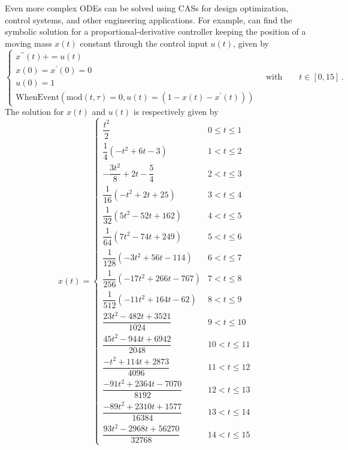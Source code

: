\begin{example}
Even more complex \acp{ODE} can be solved using \acp{CAS} for design optimization, control systems, and other engineering applications. For example, \Mathematica{} can find the symbolic solution for a proportional-derivative controller keeping the position of a moving mass $x(t)$ constant through the control input $u(t)$, given by
%
\begin{equation}
  \begin{cases}
    x^{\prime\prime}(t) + = u(t) \\[0.1em]
    x(0) = x^{\prime}(0) = 0 \\[0.1em]
    u(0) = 1 \\[0.1em]
    \mathrm{WhenEvent}(\mathrm{mod}(t, \tau) = 0, u(t) = (1 - x(t) - x^{\prime}(t)))
  \end{cases}
  \quad \text{with} \qquad t \in [0, 15] \, \text{.}
\end{equation}
%
The solution for $x(t)$ and $u(t)$ is respectively given by
%
\begin{equation}
  x(t) = \begin{cases}
    \dfrac{t^2}{2} & 0\leq t\leq 1 \\[0.1em]
    \dfrac{1}{4} \left(-t^2+6 t-3\right) & 1<t\leq 2 \\[0.1em]
    -\dfrac{3 t^2}{8}+2 t-\dfrac{5}{4} & 2<t\leq 3 \\[0.1em]
    \dfrac{1}{16} \left(-t^2+2 t+25\right) & 3<t\leq 4 \\[0.1em]
    \dfrac{1}{32} \left(5 t^2-52 t+162\right) & 4<t\leq 5 \\[0.1em]
    \dfrac{1}{64} \left(7 t^2-74 t+249\right) & 5<t\leq 6 \\[0.1em]
    \dfrac{1}{128} \left(-3 t^2+56 t-114\right) & 6<t\leq 7 \\[0.1em]
    \dfrac{1}{256} \left(-17 t^2+266 t-767\right) & 7<t\leq 8 \\[0.1em]
    \dfrac{1}{512} \left(-11 t^2+164 t-62\right) & 8<t\leq 9 \\[0.1em]
    \dfrac{23 t^2-482 t+3521}{1024} & 9<t\leq 10 \\[0.1em]
    \dfrac{45 t^2-944 t+6942}{2048} & 10<t\leq 11 \\[0.1em]
    \dfrac{-t^2+114 t+2873}{4096} & 11<t\leq 12 \\[0.1em]
    \dfrac{-91 t^2+2364 t-7070}{8192} & 12<t\leq 13 \\[0.1em]
    \dfrac{-89 t^2+2310 t+1577}{16384} & 13<t\leq 14 \\[0.1em]
    \dfrac{93 t^2-2968 t+56270}{32768} & 14<t\leq 15

\end{cases}
\end{equation}
\end{example}
